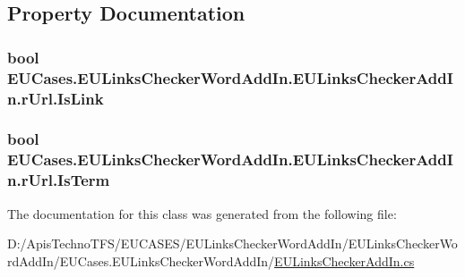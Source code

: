 \subsection{Property Documentation}
\hypertarget{class_e_u_cases_1_1_e_u_links_checker_word_add_in_1_1_e_u_links_checker_add_in_1_1r_url_af220e6311a71007a58b0827bd1054845}{
\subsubsection[{Is\+Link}]{\setlength{\rightskip}{0pt plus 5cm}bool E\+U\+Cases.\+E\+U\+Links\+Checker\+Word\+Add\+In.\+E\+U\+Links\+Checker\+Add\+In.\+r\+Url.\+Is\+Link\hspace{0.3cm}{\ttfamily [get]}}}\label{class_e_u_cases_1_1_e_u_links_checker_word_add_in_1_1_e_u_links_checker_add_in_1_1r_url_af220e6311a71007a58b0827bd1054845}
\hypertarget{class_e_u_cases_1_1_e_u_links_checker_word_add_in_1_1_e_u_links_checker_add_in_1_1r_url_a5cffe466f83b54006a021a88038390ee}{
\subsubsection[{Is\+Term}]{\setlength{\rightskip}{0pt plus 5cm}bool E\+U\+Cases.\+E\+U\+Links\+Checker\+Word\+Add\+In.\+E\+U\+Links\+Checker\+Add\+In.\+r\+Url.\+Is\+Term\hspace{0.3cm}{\ttfamily [get]}}}\label{class_e_u_cases_1_1_e_u_links_checker_word_add_in_1_1_e_u_links_checker_add_in_1_1r_url_a5cffe466f83b54006a021a88038390ee}


The documentation for this class was generated from the following file\+:\begin{DoxyCompactItemize}
\item 
D\+:/\+Apis\+Techno\+T\+F\+S/\+E\+U\+C\+A\+S\+E\+S/\+E\+U\+Links\+Checker\+Word\+Add\+In/\+E\+U\+Links\+Checker\+Word\+Add\+In/\+E\+U\+Cases.\+E\+U\+Links\+Checker\+Word\+Add\+In/\hyperlink{_e_u_links_checker_add_in_8cs}{E\+U\+Links\+Checker\+Add\+In.\+cs}\end{DoxyCompactItemize}
